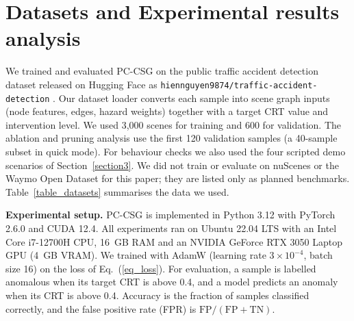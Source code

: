 \documentclass[preprint,12pt]{elsarticle}
\begin{document}
\section{Datasets and Experimental results analysis} \label{section4}
We trained and evaluated PC-CSG on the public traffic accident detection dataset released on Hugging Face as \texttt{hiennguyen9874/traffic-accident-detection} \cite{hiennguyen2024accident}. Our dataset loader converts each sample into scene graph inputs (node features, edges, hazard weights) together with a target CRT value and intervention level. We used 3,000 scenes for training and 600 for validation. The ablation and pruning analysis use the first 120 validation samples (a 40-sample subset in quick mode). For behaviour checks we also used the four scripted demo scenarios of Section~\ref{section3}. We did not train or evaluate on nuScenes \cite{caesar2020nuscenes} or the Waymo Open Dataset \cite{sun2020waymo} for this paper; they are listed only as planned benchmarks. Table~\ref{table_datasets} summarises the data we used.

\begin{table}[H]
\caption{Data used in our experiments.}
\centering
\label{table_datasets}
\end{table}

\textbf{Experimental setup.} PC-CSG is implemented in Python 3.12 with PyTorch 2.6.0 and CUDA 12.4. All experiments ran on Ubuntu 22.04 LTS with an Intel Core i7-12700H CPU, 16~GB RAM and an NVIDIA GeForce RTX 3050 Laptop GPU (4~GB VRAM). We trained with AdamW \cite{loshchilov2019adamw} (learning rate $3 \times 10^{-4}$, batch size 16) on the loss of Eq.~(\ref{eq_loss}). For evaluation, a sample is labelled anomalous when its target CRT is above 0.4, and a model predicts an anomaly when its CRT is above 0.4. Accuracy is the fraction of samples classified correctly, and the false positive rate (FPR) is $\text{FP}/(\text{FP}+\text{TN})$.
\end{document}
